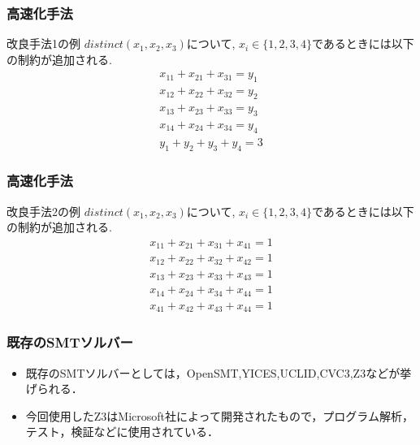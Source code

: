 \begin{frame}
    \frametitle{高速化手法}
    \vspace{-3mm}
    \begin{exampleblock}{改良手法1の例}
        $distinct(x_1, x_2, x_3)$について, $x_i \in \{1, 2, 3, 4\}$であるときには以下の制約が追加される.
        \vspace{-3mm}
        \begin{eqnarray*}
            x_{11}+x_{21}+x_{31}=y_1\\
            x_{12}+x_{22}+x_{32}=y_2\\
            x_{13}+x_{23}+x_{33}=y_3\\
            x_{14}+x_{24}+x_{34}=y_4\\
            y_1+y_2+y_3+y_4=3
        \end{eqnarray*}
    \end{exampleblock}
\end{frame}
\begin{frame}
    \frametitle{高速化手法}
    \vspace{-3mm}
    \begin{exampleblock}{改良手法2の例}
        $distinct(x_1, x_2, x_3)$について, $x_i \in \{1, 2, 3, 4\}$であるときには以下の制約が追加される.
        \vspace{-3mm}
        \begin{eqnarray*}
            x_{11}+x_{21}+x_{31}+x_{41}=1\\
            x_{12}+x_{22}+x_{32}+x_{42}=1\\
            x_{13}+x_{23}+x_{33}+x_{43}=1\\
            x_{14}+x_{24}+x_{34}+x_{44}=1\\
            x_{41}+x_{42}+x_{43}+x_{44}=1
        \end{eqnarray*}

    \end{exampleblock}
\end{frame}


\begin{frame}
    \frametitle{既存のSMTソルバー}
    \begin{itemize}
        \item 既存のSMTソルバーとしては，OpenSMT,YICES,UCLID,CVC3,Z3などが挙げられる．\\
        \item 今回使用したZ3はMicrosoft社によって開発されたもので，プログラム解析，テスト，検証などに使用されている．
    \end{itemize}
\end{frame}


